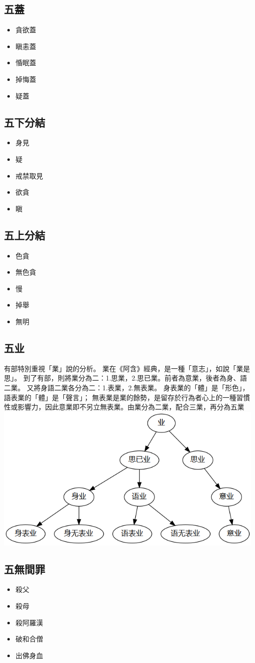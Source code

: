 \subsection{五蓋}
\begin{itemize}
  \item 貪欲蓋
  \item 瞋恚蓋
  \item 惛眠蓋
  \item 掉悔蓋
  \item 疑蓋
\end{itemize}

\subsection{五下分結}
\begin{itemize}
  \item 身見
  \item 疑
  \item 戒禁取見
  \item 欲貪
  \item 瞋
\end{itemize}

\subsection{五上分結}
\begin{itemize}
  \item 色貪
  \item 無色貪
  \item 慢
  \item 掉舉
  \item 無明
\end{itemize}


\subsection{五业}
有部特別重視「業」說的分析。
業在《阿含》經典，是一種「意志」，如說「業是思」。
到了有部，則將業分為二：1.思業，2.思已業。前者為意業，後者為身、語二業。
又將身語二業各分為二：1.表業，2.無表業。
身表業的「體」是「形色」，語表業的「體」是「聲言」；
無表業是業的餘勢，是留存於行為者心上的一種習慣性或影響力，因此意業即不另立無表業。由業分為二業，配合三業，再分為五業
\includegraphics[scale=0.5]{释家/images/五业.png}

\subsection{五無間罪}
\begin{itemize}
  \item 殺父
  \item 殺母
  \item 殺阿羅漢
  \item 破和合僧
  \item 出佛身血
\end{itemize}
